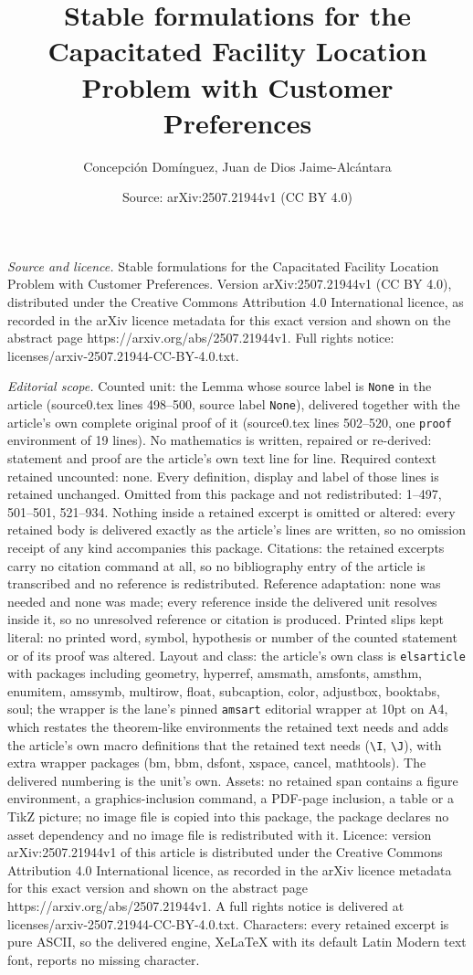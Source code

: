 \documentclass[10pt,a4paper]{amsart}
\title[Stable formulations for the Capacitated Facility Location Pr]{Stable formulations for the Capacitated Facility Location Problem with Customer Preferences}
\author{Concepci\'on Dom\'inguez, Juan de Dios Jaime-Alc\'antara}
\date{Source: arXiv:2507.21944v1 (CC BY 4.0)}
\begin{document}
\maketitle

\noindent\emph{Source and licence.} Stable formulations for the Capacitated Facility Location Problem with Customer Preferences. Version arXiv:2507.21944v1 (CC BY 4.0), distributed under the Creative Commons Attribution 4.0 International licence, as recorded in the arXiv licence metadata for this exact version and shown on the abstract page https://arxiv.org/abs/2507.21944v1. Full rights notice: licenses/arxiv-2507.21944-CC-BY-4.0.txt.\par\smallskip

\noindent\textit{Editorial scope.} Counted unit: the Lemma whose source label is \texttt{None} in the article (source0.tex lines 498--500, source label \texttt{None}), delivered together with the article's own complete original proof of it (source0.tex lines 502--520, one \texttt{proof} environment of 19 lines). No mathematics is written, repaired or re-derived: statement and proof are the article's own text line for line. Required context retained uncounted: none. Every definition, display and label of those lines is retained unchanged. Omitted from this package and not redistributed: 1--497, 501--501, 521--934. Nothing inside a retained excerpt is omitted or altered: every retained body is delivered exactly as the article's lines are written, so no omission receipt of any kind accompanies this package. Citations: the retained excerpts carry no citation command at all, so no bibliography entry of the article is transcribed and no reference is redistributed. Reference adaptation: none was needed and none was made; every reference inside the delivered unit resolves inside it, so no unresolved reference or citation is produced. Printed slips kept literal: no printed word, symbol, hypothesis or number of the counted statement or of its proof was altered. Layout and class: the article's own class is \texttt{elsarticle} with packages including geometry, hyperref, amsmath, amsfonts, amsthm, enumitem, amssymb, multirow, float, subcaption, color, adjustbox, booktabs, soul; the wrapper is the lane's pinned \texttt{amsart} editorial wrapper at 10pt on A4, which restates the theorem-like environments the retained text needs and adds the article's own macro definitions that the retained text needs (\texttt{\textbackslash I}, \texttt{\textbackslash J}), with extra wrapper packages (bm, bbm, dsfont, xspace, cancel, mathtools). The delivered numbering is the unit's own. Assets: no retained span contains a figure environment, a graphics-inclusion command, a PDF-page inclusion, a table or a TikZ picture; no image file is copied into this package, the package declares no asset dependency and no image file is redistributed with it. Licence: version arXiv:2507.21944v1 of this article is distributed under the Creative Commons Attribution 4.0 International licence, as recorded in the arXiv licence metadata for this exact version and shown on the abstract page https://arxiv.org/abs/2507.21944v1. A full rights notice is delivered at licenses/arxiv-2507.21944-CC-BY-4.0.txt. Characters: every retained excerpt is pure ASCII, so the delivered engine, XeLaTeX with its default Latin Modern text font, reports no missing character.
\end{document}
